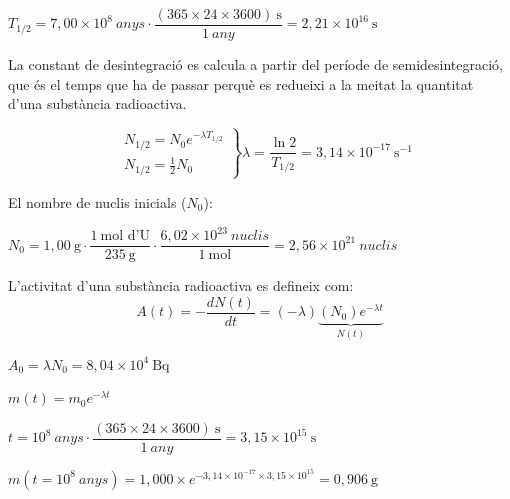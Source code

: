 \begin{solapartat}
 $T_{1/2} = 7,00\times 10^{8}\ \textit{anys}\cdot\dfrac{(365\times 24\times 3600)\ \mathrm{s}}{1\ \textit{any}} = 2,21\times 10^{16}\ \mathrm{s}$

La constant de desintegració es calcula a partir del període de semidesintegració, que és el temps que ha de passar perquè es redueixi a la meitat la quantitat d'una substància radioactiva.

\[ \left.\begin{aligned} &N_{1/2} = N_0 e^{-\lambda T_{1/2}}\\ &N_{1/2} = \frac{1}{2}N_0\end{aligned}\right\}\lambda = \frac{\ln 2}{T_{1/2}} = 3,14\times 10^{-17}\ \mathrm{s^{-1}} \]

El nombre de nuclis inicials ($N_0$):

 $N_0 = 1,00\ \mathrm{g}\cdot\dfrac{1\ \text{mol d'U}}{235\ \mathrm{g}}\cdot\dfrac{6,02\times 10^{23}\ \textit{nuclis}}{1\ \mathrm{mol}} = 2,56\times 10^{21}\ \textit{nuclis}$

 L'activitat d'una substància radioactiva es defineix com:
\[ A(t) = -\frac{dN(t)}{dt} = (-\lambda)\underbrace{(N_0)e^{-\lambda t}}_{N(t)} \]

 $A_0 = \lambda N_0 = 8,04\times 10^{4}\ \mathrm{Bq}$
\end{solapartat}

\begin{solapartat}
 $m(t) = m_0 e^{-\lambda t}$

 $t = 10^{8}\ \textit{anys}\cdot\dfrac{(365\times 24\times 3600)\ \mathrm{s}}{1\ \textit{any}} = 3,15\times 10^{15}\ \mathrm{s}$

 $m(t = 10^{8}\ \textit{anys}) = 1,000\times e^{-3,14\times 10^{-17}\times 3,15\times 10^{15}} = 0,906\ \mathrm{g}$
\end{solapartat}

